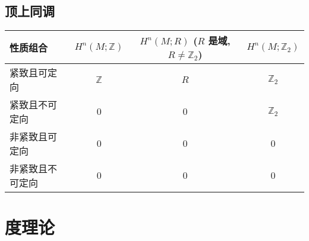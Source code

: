 \documentclass[../../几何与拓扑.tex]{subfiles}
\begin{document}
\subsection{顶上同调}
\begin{tabular}{|l | c | c | c|}
\hline
性质组合             & $H^n(M; \mathbb{Z})$ & $H^n(M; R)$ (\(  R  \)  是域, $R \neq \mathbb{Z}_2$) & $H^n(M; \mathbb{Z}_2)$ \\
\hline
紧致且可定向         & $\mathbb{Z}$         & $R$                                       & $\mathbb{Z}_2$         \\
\hline
紧致且不可定向       & $0$                  & $0$                                       & $\mathbb{Z}_2$         \\
\hline
非紧致且可定向       & $0$                  & $0$                                       & $0$                    \\
\hline
非紧致且不可定向     & $0$                  & $0$                                       & $0$                    \\
\hline
\end{tabular}

\section{度理论}
\end{document}
